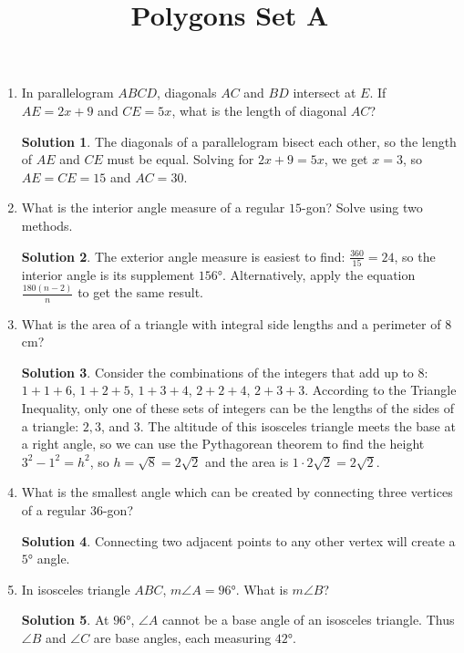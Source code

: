 \documentclass{article}
\title{Polygons Set A}
\author{}
\date{}
\theoremstyle{definition}
\newtheorem*{solution}{Solution}
\begin{document}
\maketitle

\begin{multicols}{2}
    \begin{enumerate}
        \item In parallelogram $ABCD$, diagonals $AC$ and $BD$ intersect at $E$.
            If $AE = 2x + 9$ and $CE = 5x$, what is the length of diagonal $AC$?
            \begin{solution}
                The diagonals of a parallelogram bisect each other, so the length of $AE$ and $CE$ must be equal.
                Solving for $2x + 9 = 5x$, we get $x = 3$, so $AE = CE = 15$ and $AC = 30$.
            \end{solution}
        \item What is the interior angle measure of a regular $15$-gon?
            Solve using two methods.
            \begin{solution}
                The exterior angle measure is easiest to find: $\frac{360}{15} = 24$, so the interior angle is its supplement $\ang{156}$.
                Alternatively, apply the equation $\frac{180(n - 2)}{n}$ to get the same result.
            \end{solution}
        \item What is the area of a triangle with integral side lengths and a perimeter of $8$ cm?
            \begin{solution}
                Consider the combinations of the integers that add up to $8$: $1 + 1 + 6$, $1 + 2 + 5$, $1 + 3 + 4$, $2 + 2+ 4$, $2 + 3 + 3$.
                According to the Triangle Inequality, only one of these sets of integers can be the lengths of the sides of a triangle: $2, 3$, and $3$.
                The altitude of this isosceles triangle meets the base at a right angle, so we can use the Pythagorean theorem to find the height $3^2 -1^2 = h^2$, so $h = \sqrt{8} = 2\sqrt{2}$ and the area is $1 \cdot 2\sqrt{2} = 2\sqrt{2}$.
            \end{solution}
        \item What is the smallest angle which can be created by connecting three vertices of a regular $36$-gon?
            \begin{solution}
                Connecting two adjacent points to any other vertex will create a $\ang{5}$ angle.
            \end{solution}
        \item In isosceles triangle $ABC$, $m\angle A = \ang{96}$.
            What is $m\angle B$?
            \begin{solution}
                At $\ang{96}$, $\angle A$ cannot be a base angle of an isosceles triangle.
                Thus $\angle B$ and $\angle C$ are base angles, each measuring $\ang{42}$.
            \end{solution}
    \end{enumerate}
\end{multicols}
\end{document}
